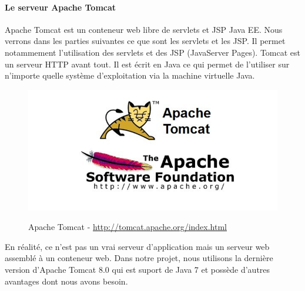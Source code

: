 \paragraph{Le serveur Apache Tomcat}
Apache Tomcat est un conteneur web libre de servlets et JSP Java EE. Nous verrons dans les parties suivantes ce que sont les servlets et les JSP. Il permet notammement l'utilisation des servlets et des JSP (JavaServer Pages).
Tomcat est un serveur HTTP avant tout. Il est écrit en Java ce qui permet de l'utiliser sur n'importe quelle système d'exploitation via la machine virtuelle Java.\\
\begin{figure}[H]
  \center
  \includegraphics[scale=0.3]{../graph/apache.png} \\
  \caption{Apache Tomcat - \url{http://tomcat.apache.org/index.html}}
\end{figure}
En réalité, ce n'est pas un vrai serveur d'application mais un serveur web assemblé à un conteneur web. Dans notre projet, nous utilisons la dernière version d'Apache Tomcat 8.0 qui est suport de Java 7 et possède d'autres avantages dont nous avons besoin.\\

